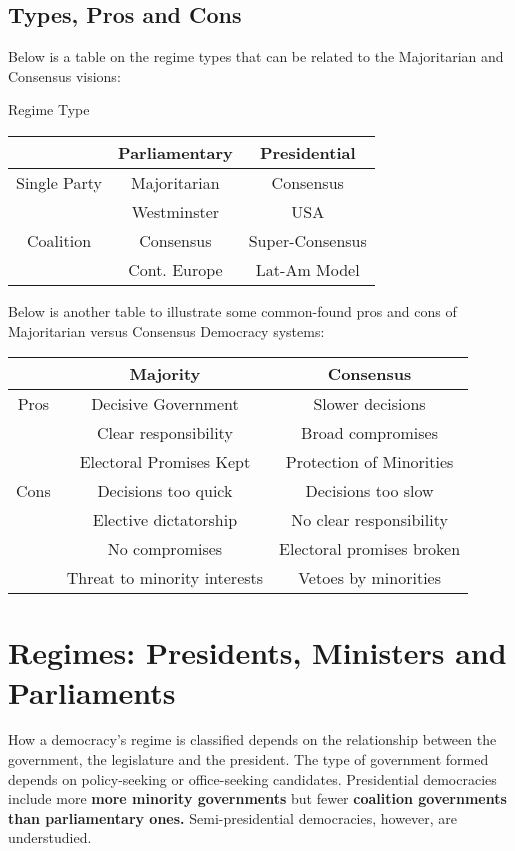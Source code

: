 \documentclass[12pt, letterpaper]{article}
\begin{document}
\subsection{Types, Pros and Cons}
Below is a table on the regime types that can be related to the Majoritarian and Consensus visions:
\begin{center}
	Regime Type\\
	\begin{tabular}{c|c|c}
		& Parliamentary & Presidential\\
		\hline
		Single Party & Majoritarian & Consensus\\
			     & Westminster & USA\\
		\hline
		Coalition & Consensus & Super-Consensus\\
			  & Cont. Europe & Lat-Am Model\\
	\end{tabular}
\end{center}
Below is another table to illustrate some common-found pros and cons of Majoritarian versus Consensus Democracy systems:
\begin{center}
	\begin{tabular}{c|c|c}
		& Majority & Consensus\\
		\hline
		Pros & Decisive Government & Slower decisions\\
		     & Clear responsibility & Broad compromises\\
		     & Electoral Promises Kept & Protection of Minorities\\
		\hline
		Cons & Decisions too quick & Decisions too slow\\
		     & Elective dictatorship & No clear responsibility\\
		     & No compromises & Electoral promises broken\\
		     & Threat to minority interests & Vetoes by minorities
	\end{tabular}
\end{center}

\newpage
\section{Regimes: Presidents, Ministers and Parliaments}
How a democracy's regime is classified depends on the relationship between the government, the legislature and the president. The type of government formed depends on policy-seeking or office-seeking candidates.
Presidential democracies include more \textbf{more minority governments} but fewer \textbf{coalition governments than parliamentary ones.} Semi-presidential democracies, however, are understudied.
\end{document}
